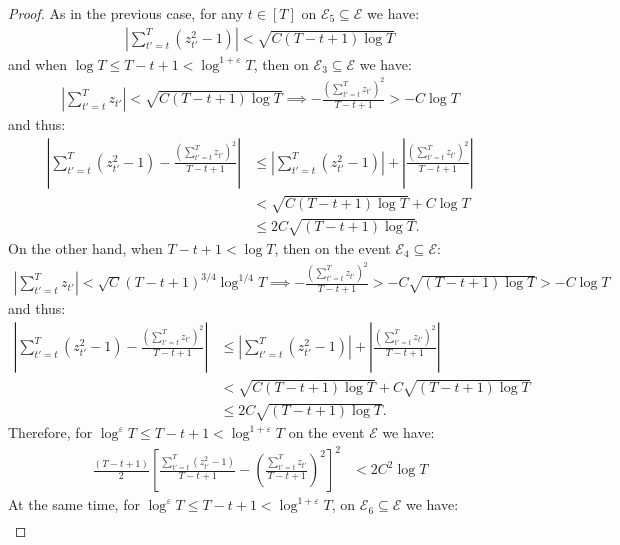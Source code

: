 \begin{proof}
As in the previous case, for any $t \in [T]$ on $\mathcal{E}_5 \subseteq \mathcal{E}$ we have: 
\begin{align*}
     \left|\sum_{t'=t}^T (z_{t'}^2-1)\right| < \sqrt{C(T-t+1)\log T}
\end{align*}
and when $\log T \leq T -t+1 < \log^{1+\varepsilon} T$, then on $\mathcal{E}_3 \subseteq \mathcal{E}$ we have:
\begin{align*}
    \left|\sum_{t'=t}^T z_{t'}\right| < \sqrt{C(T-t+1)\log T}\implies - \frac{\left(\sum_{t'=t}^T z_{t'}\right)^2}{T-t+1} > -C \log T
\end{align*}
and thus:
\small
\begin{align*}
    \left|\sum_{t'=t}^T (z_{t'}^2-1) - \frac{\left(\sum_{t'=t}^T z_{t'}\right)^2}{T-t+1}\right| &\leq \left|\sum_{t'=t}^T (z_{t'}^2-1)\right|  + \left| \frac{\left(\sum_{t'=t}^T z_{t'}\right)^2}{T-t+1}\right| \\
    &<\sqrt{C(T-t+1)\log T} + C\log T \\
    &\leq 2C\sqrt{(T-t+1)\log T}. \tag{$T-t+1 \geq \log T$ and $C > 1$ WLOG} 
\end{align*}
\normalsize
On the other hand, when $T -t+1 < \log T$, then on the event $\mathcal{E}_4 \subseteq\mathcal{E}$:
\begin{align*}
    \left|\sum_{t'=t}^T z_{t'}\right| < \sqrt{C}(T-t+1)^{3/4}\log^{1/4} T \implies - \frac{\left(\sum_{t'=t}^T z_{t'}\right)^2}{T-t+1} > - C \sqrt{(T-t+1)\log T} > - C \log T
\end{align*}
and thus: 
\small
\begin{align*}
    \left|\sum_{t'=t}^T (z_{t'}^2-1) - \frac{\left(\sum_{t'=t}^T z_{t'}\right)^2}{T-t+1}\right| &\leq \left|\sum_{t'=t}^T (z_{t'}^2-1)\right|  + \left| \frac{\left(\sum_{t'=t}^T z_{t'}\right)^2}{T-t+1}\right| \\
    &< \sqrt{C(T-t+1)\log T} + C\sqrt{(T-t+1)\log T}\\
    &\leq 2C\sqrt{(T-t+1)\log T}. \tag{$C > 1$ WLOG} 
\end{align*}
\normalsize
Therefore, for  $\log^{\varepsilon} T \leq T -t+1 < \log^{1+\varepsilon} T$ on the event $\mathcal{E}$ we have:
\begin{align*}
    \frac{(T-t+1)}{2}\left[\frac{\sum_{t'=t}^T (z_{t'}^2-1)}{T-t+1} - \left(\frac{\sum_{t'=t}^T z_{t'}}{T-t+1}\right)^2 \right]^2 &< 2C^2\log T
\end{align*}
At the same time, for  $\log^{\varepsilon} T \leq T -t+1 < \log^{1+\varepsilon} T$, on $\mathcal{E}_6 \subseteq \mathcal{E}$ we have: 
\begin{align*}

\end{align*}
\end{proof}
